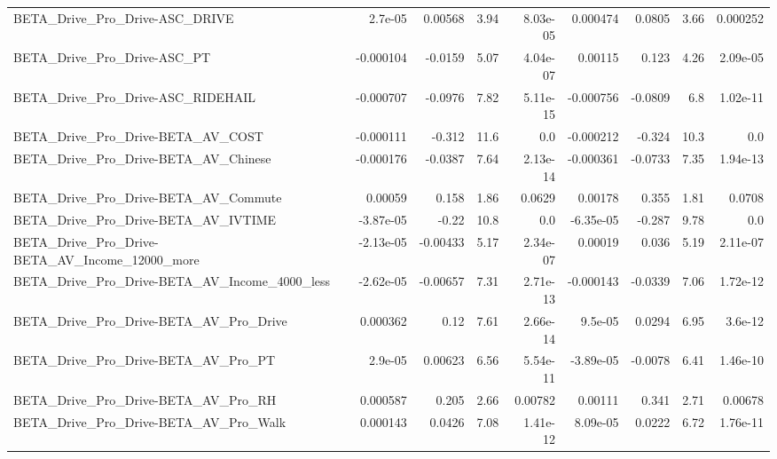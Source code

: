 \begin{tabular}{lrrrrrrrr}
BETA\_Drive\_Pro\_Drive-ASC\_DRIVE                     &     2.7e-05 &      0.00568 &      3.94 & 8.03e-05 &   0.000474 &      0.0805 &         3.66 &      0.000252 \\
BETA\_Drive\_Pro\_Drive-ASC\_PT                        &   -0.000104 &      -0.0159 &      5.07 & 4.04e-07 &    0.00115 &       0.123 &         4.26 &      2.09e-05 \\
BETA\_Drive\_Pro\_Drive-ASC\_RIDEHAIL                  &   -0.000707 &      -0.0976 &      7.82 & 5.11e-15 &  -0.000756 &     -0.0809 &          6.8 &      1.02e-11 \\
BETA\_Drive\_Pro\_Drive-BETA\_AV\_COST                  &   -0.000111 &       -0.312 &      11.6 &      0.0 &  -0.000212 &      -0.324 &         10.3 &           0.0 \\
BETA\_Drive\_Pro\_Drive-BETA\_AV\_Chinese               &   -0.000176 &      -0.0387 &      7.64 & 2.13e-14 &  -0.000361 &     -0.0733 &         7.35 &      1.94e-13 \\
BETA\_Drive\_Pro\_Drive-BETA\_AV\_Commute               &     0.00059 &        0.158 &      1.86 &   0.0629 &    0.00178 &       0.355 &         1.81 &        0.0708 \\
BETA\_Drive\_Pro\_Drive-BETA\_AV\_IVTIME                &   -3.87e-05 &        -0.22 &      10.8 &      0.0 &  -6.35e-05 &      -0.287 &         9.78 &           0.0 \\
BETA\_Drive\_Pro\_Drive-BETA\_AV\_Income\_12000\_more     &   -2.13e-05 &     -0.00433 &      5.17 & 2.34e-07 &    0.00019 &       0.036 &         5.19 &      2.11e-07 \\
BETA\_Drive\_Pro\_Drive-BETA\_AV\_Income\_4000\_less      &   -2.62e-05 &     -0.00657 &      7.31 & 2.71e-13 &  -0.000143 &     -0.0339 &         7.06 &      1.72e-12 \\
BETA\_Drive\_Pro\_Drive-BETA\_AV\_Pro\_Drive             &    0.000362 &         0.12 &      7.61 & 2.66e-14 &    9.5e-05 &      0.0294 &         6.95 &       3.6e-12 \\
BETA\_Drive\_Pro\_Drive-BETA\_AV\_Pro\_PT                &     2.9e-05 &      0.00623 &      6.56 & 5.54e-11 &  -3.89e-05 &     -0.0078 &         6.41 &      1.46e-10 \\
BETA\_Drive\_Pro\_Drive-BETA\_AV\_Pro\_RH                &    0.000587 &        0.205 &      2.66 &  0.00782 &    0.00111 &       0.341 &         2.71 &       0.00678 \\
BETA\_Drive\_Pro\_Drive-BETA\_AV\_Pro\_Walk              &    0.000143 &       0.0426 &      7.08 & 1.41e-12 &   8.09e-05 &      0.0222 &         6.72 &      1.76e-11 \\

\end{tabular}
